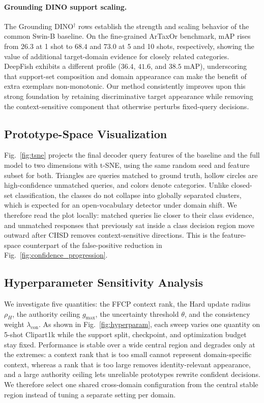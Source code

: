 \paragraph{Grounding DINO support scaling.}
The Grounding DINO$^\dagger$ rows establish the strength and scaling behavior of the common Swin-B baseline. On the fine-grained ArTaxOr benchmark, mAP rises from $26.3$ at 1 shot to $68.4$ and $73.0$ at 5 and 10 shots, respectively, showing the value of additional target-domain evidence for closely related categories. DeepFish exhibits a different profile ($36.4$, $41.6$, and $38.5$ mAP), underscoring that support-set composition and domain appearance can make the benefit of extra exemplars non-monotonic. Our method consistently improves upon this strong foundation by retaining discriminative target appearance while removing the context-sensitive component that otherwise perturbs fixed-query decisions.

\subsection{Prototype-Space Visualization}
\label{sec:tsne}



Fig.~\ref{fig:tsne} projects the final decoder query features of the baseline
and the full model to two dimensions with t-SNE, using the same random seed and
feature subset for both. Triangles are queries matched to ground truth, hollow
circles are high-confidence unmatched queries, and colors denote categories.
Unlike closed-set classification, the classes do not collapse into globally
separated clusters, which is expected for an open-vocabulary detector under
domain shift. We therefore read the plot locally: matched queries lie closer to
their class evidence, and unmatched responses that previously sat inside a
class decision region move outward after CHSD removes context-sensitive
directions. This is the feature-space counterpart of the false-positive
reduction in Fig.~\ref{fig:confidence_progression}.

\subsection{Hyperparameter Sensitivity Analysis}
\label{sec:exp_sensitivity}



We investigate five quantities: the FFCP context rank, the Hard update radius
$\rho_H$, the authority ceiling $g_{\max}$, the uncertainty threshold $\theta$,
and the consistency weight $\lambda_{\mathrm{con}}$. As shown in
Fig.~\ref{fig:hyperparam}, each sweep varies one quantity on 5-shot Clipart1k
while the support split, checkpoint, and optimization budget stay fixed.
Performance is stable over a wide central region and degrades only at the
extremes: a context rank that is too small cannot represent domain-specific
context, whereas a rank that is too large removes identity-relevant appearance,
and a large authority ceiling lets unreliable prototypes rewrite confident
decisions. We therefore select one shared cross-domain configuration from the
central stable region instead of tuning a separate setting per domain.

